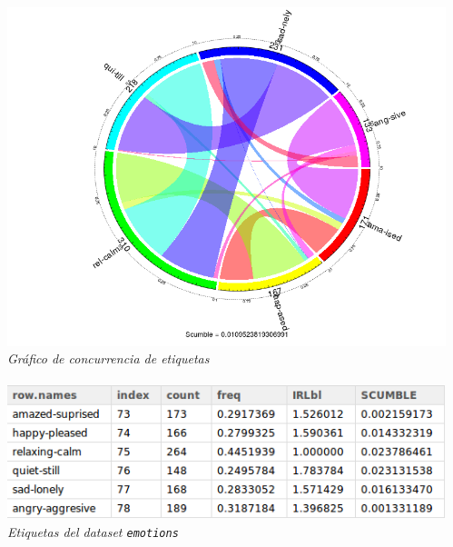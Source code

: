 \documentclass[8pt]{beamer}
\begin{document}
\begin{frame}
\begin{columns}[T]
\begin{column}{.5\textwidth}
		\end{column}
		\begin{column}{.5\textwidth}
			\begin{center}
				\includegraphics[width=.9\textwidth]{imgs/emotions-concurrence}
				\\ \centering \textit{Gráfico de concurrencia de etiquetas}
				\\~\\
				\includegraphics[width=.9\textwidth]{imgs/emotions-dataset}
				\\ \centering \textit{Etiquetas del dataset \texttt{emotions}}
			\end{center}
		\end{column}
	\end{columns}
  \end{frame}


\end{document}
